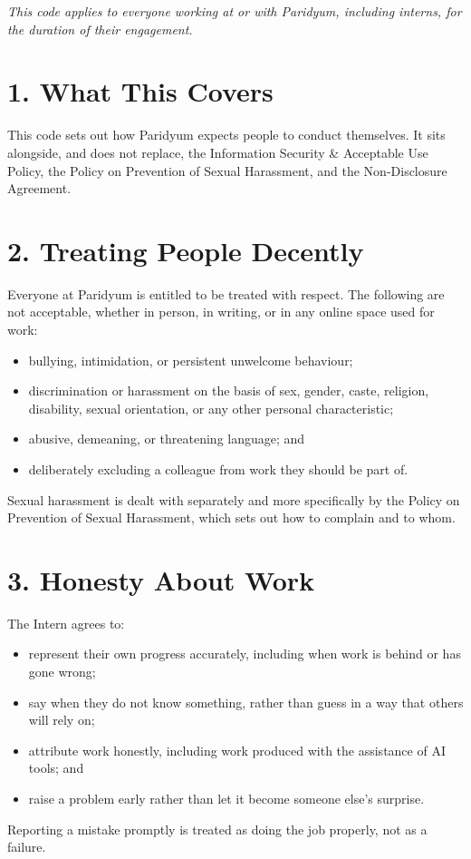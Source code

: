 \documentclass{paridyum}
\begin{document}
\paridyumletterhead
\paridyumdateref{\dkDocDate}{\dkDocRef}

\textit{This code applies to everyone working at or with Paridyum, including
interns, for the duration of their engagement.}

\section*{1. What This Covers}
This code sets out how Paridyum expects people to conduct themselves. It sits
alongside, and does not replace, the Information Security \& Acceptable Use
Policy, the Policy on Prevention of Sexual Harassment, and the Non-Disclosure
Agreement.

\section*{2. Treating People Decently}
Everyone at Paridyum is entitled to be treated with respect. The following are
not acceptable, whether in person, in writing, or in any online space used for
work:
\begin{itemize}[leftmargin=*, noitemsep]
    \item bullying, intimidation, or persistent unwelcome behaviour;
    \item discrimination or harassment on the basis of sex, gender, caste,
          religion, disability, sexual orientation, or any other personal
          characteristic;
    \item abusive, demeaning, or threatening language; and
    \item deliberately excluding a colleague from work they should be part of.
\end{itemize}
Sexual harassment is dealt with separately and more specifically by the Policy
on Prevention of Sexual Harassment, which sets out how to complain and to whom.

\section*{3. Honesty About Work}
The Intern agrees to:
\begin{itemize}[leftmargin=*, noitemsep]
    \item represent their own progress accurately, including when work is
          behind or has gone wrong;
    \item say when they do not know something, rather than guess in a way
          that others will rely on;
    \item attribute work honestly, including work produced with the
          assistance of AI tools; and
    \item raise a problem early rather than let it become someone else's
          surprise.
\end{itemize}
Reporting a mistake promptly is treated as doing the job properly, not as a
failure.
\end{document}
